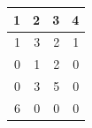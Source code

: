 \begin{tabular}{rrrr}
\toprule
1 & 2 & 3 & 4 \\
\midrule
1 & 3 & 2 & 1 \\
0 & 1 & 2 & 0 \\
0 & 3 & 5 & 0 \\
6 & 0 & 0 & 0 \\
\bottomrule
\end{tabular}
